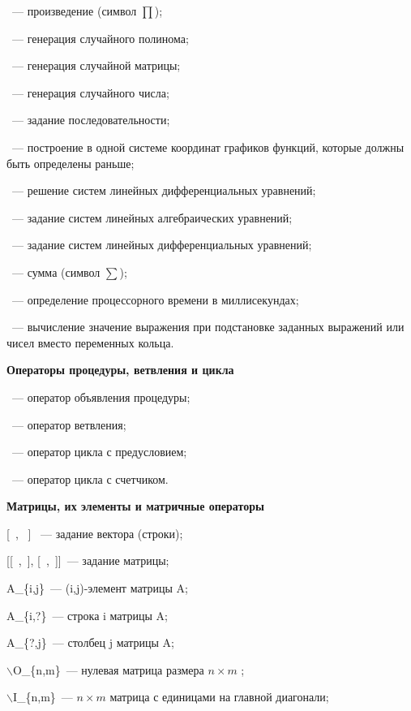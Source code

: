  ~--- произведение (символ $\prod$);

 ~--- генерация случайного полинома;

 ~--- генерация случайной матрицы;

 ~--- генерация случайного числа;

 ~--- задание последовательности;

 ~--- построение в одной системе координат графиков функций, которые должны быть определены раньше;

 ~--- решение систем линейных дифференциальных уравнений;

 ~--- задание систем линейных алгебраических уравнений;

 ~--- задание систем линейных дифференциальных уравнений;

 ~---  сумма (символ $\sum$);

 ~--- определение процессорного времени в миллисекундах;

 ~--- вычисление значение выражения при подстановке заданных выражений или чисел вместо переменных кольца.

 \bigskip
 
 {\bf Операторы процедуры,  ветвления и цикла}

 ~--- оператор объявления процедуры; 
 
 ~--- оператор ветвления; 

~--- оператор цикла с предусловием; 

~--- оператор цикла с счетчиком.  
\bigskip

{\bf Матрицы, их элементы и матричные операторы}

[\ , \  ] ~--- задание вектора (строки);

[[\ ,\  ], [\ ,\  ]]~--- задание матрицы;


A\_\{i,j\}~--- (i,j)-элемент матрицы A;  

A\_\{i,?\}~---  строка i матрицы A; 

A\_\{?,j\}~--- столбец j  матрицы A; 

$\backslash$O\_\{n,m\}~--- нулевая матрица размера $n \times m$ ; 

$\backslash$I\_\{n,m\}~---  $n \times m$ матрица  с единицами на главной диагонали; 

